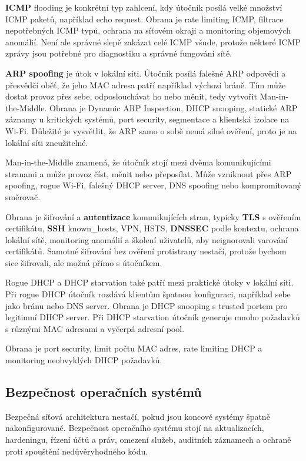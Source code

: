 \documentclass[11pt,a4paper]{article}
\begin{document}
\textbf{ICMP} flooding je konkrétní typ zahlcení, kdy útočník posílá velké množství ICMP paketů, například echo request. Obrana je rate limiting ICMP, filtrace nepotřebných ICMP typů, ochrana na síťovém okraji a monitoring objemových anomálií. Není ale správné slepě zakázat celé ICMP všude, protože některé ICMP zprávy jsou potřebné pro diagnostiku a správné fungování sítě.

\textbf{ARP spoofing} je útok v lokální síti. Útočník posílá falešné ARP odpovědi a přesvědčí oběť, že jeho MAC adresa patří například výchozí bráně. Tím může dostat provoz přes sebe, odposlouchávat ho nebo měnit, tedy vytvořit Man-in-the-Middle. Obrana je Dynamic ARP Inspection, DHCP snooping, statické ARP záznamy u kritických systémů, port security, segmentace a klientská izolace na Wi-Fi. Důležité je vysvětlit, že ARP samo o sobě nemá silné ověření, proto je na lokální síti zneužitelné.

Man-in-the-Middle znamená, že útočník stojí mezi dvěma komunikujícími stranami a může provoz číst, měnit nebo přeposílat. Může vzniknout přes ARP spoofing, rogue Wi-Fi, falešný DHCP server, DNS spoofing nebo kompromitovaný směrovač.

Obrana je šifrování a \textbf{autentizace} komunikujících stran, typicky \textbf{TLS} s ověřením certifikátu, \textbf{SSH} known\_hosts, VPN, HSTS, \textbf{DNSSEC} podle kontextu, ochrana lokální sítě, monitoring anomálií a školení uživatelů, aby neignorovali varování certifikátů. Samotné šifrování bez ověření protistrany nestačí, protože bychom sice šifrovali, ale možná přímo s útočníkem.

Rogue DHCP a DHCP starvation také patří mezi praktické útoky v lokální síti. Při rogue DHCP útočník rozdává klientům špatnou konfiguraci, například sebe jako bránu nebo DNS server. Obrana je DHCP snooping s trusted portem pro legitimní DHCP server. Při DHCP starvation útočník generuje mnoho požadavků s různými MAC adresami a vyčerpá adresní pool.

Obrana je port security, limit počtu MAC adres, rate limiting DHCP a monitoring neobvyklých DHCP požadavků.

\subsection*{Bezpečnost operačních systémů}

Bezpečná síťová architektura nestačí, pokud jsou koncové systémy špatně nakonfigurované. Bezpečnost operačního systému stojí na aktualizacích, hardeningu, řízení účtů a práv, omezení služeb, auditních záznamech a ochraně proti spouštění nedůvěryhodného kódu.
\end{document}
